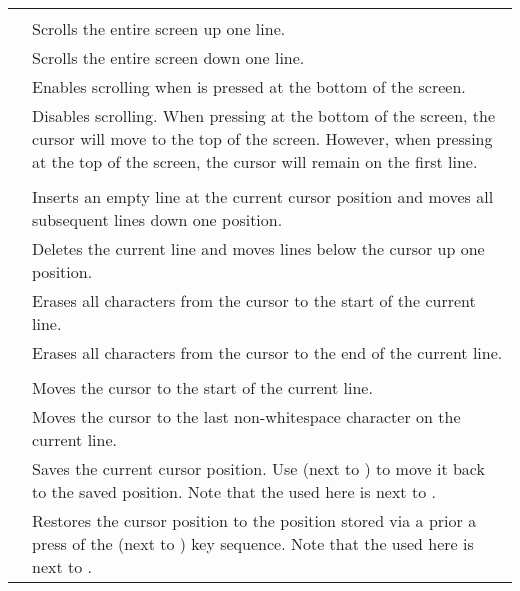 \begin{center}
\begin{longtable}{c|L{5.5cm}}
  \hhline{==}
   \\
  \hhline{==}
  &
Scrolls the entire screen up one line.\\
\hline
{}  &
Scrolls the entire screen down one line.\\
\hline
{}  &
Enables scrolling when \megakey{$\downarrow$} is pressed at the bottom of the screen.\\
\hline
{}  &
Disables scrolling. When pressing \megakey{$\downarrow$} at the bottom of the screen, the cursor will move to the top of the
screen. However, when pressing \megakey{$\uparrow$} at the top of the screen, the cursor will remain on the first line.\\
  \hhline{==}
   \\
  \hhline{==}
  &
Inserts an empty line at the current cursor position and moves all subsequent lines down one position.\\
\hline
{}  &
Deletes the current line and moves lines below the cursor up one position.\\
\hline
{}  &
Erases all characters from the cursor to the start of the current line.\\
\hline
{}  &
Erases all characters from the cursor to the end of the current line.\\
  \hhline{==}
   \\
  \hhline{==}
  &
Moves the cursor to the start of the current line.\\
\hline
{}  &
Moves the cursor to the last non-whitespace character on the current line.\\
\hline
{} \megakeywhite{$\uparrow$} &
Saves the current cursor position. Use  \megakeywhite{$\leftarrow$} (next to ) to move it
    back
to the saved position. Note that the \megakeywhite{$\uparrow$} used here is next to .\\
\hline
{} \megakeywhite{$\leftarrow$} &
Restores the cursor position to the position stored via a prior a press of the 
    \megakeywhite{$\uparrow$}
(next to ) key sequence. Note that the \megakeywhite{$\leftarrow$} used here is next to .\\


\end{longtable}
\end{center}
